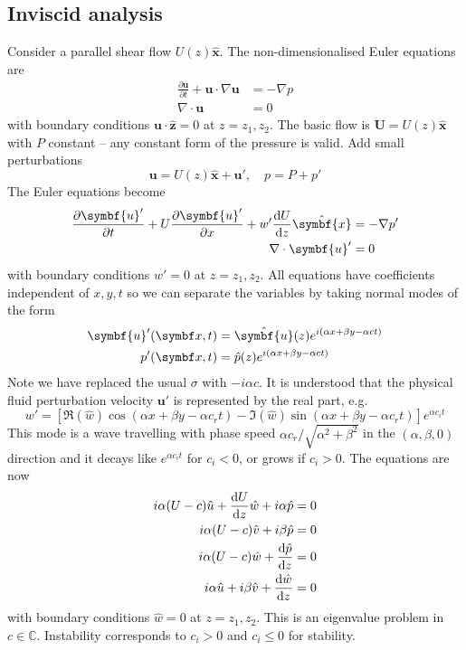 \documentclass{jknotes}
\renewcommand{\u}{\symbf{u}}
\begin{document}
\subsection{Inviscid analysis}
Consider a parallel shear flow $U(z)\hat{\symbf{x}}$. The non-dimensionalised
Euler equations are
\begin{align}
	\frac{\partial \u}{\partial t} + \u \cdot  \nabla \u &= - \nabla p \\
	\nabla \cdot \u &= 0
\end{align}
with boundary conditions $\u \cdot \hat{\symbf{z}} = 0$ at $z=z_1,z_2$. The
basic flow is $\symbf{U} = U(z)\hat{\symbf{x}}$ with $P$ constant -- any
constant form of the pressure is valid.  Add small perturbations
\begin{equation}
	\u = U(z)\hat{\symbf{x}} + \u', \hspace{1em}p = P + p'
\end{equation}
The Euler equations become
\begin{align}
	\frac{\partial \u'}{\partial t} + U\frac{\partial \u'}{\partial x} + w'
	\frac{\diffd U}{\diffd z} \hat{\symbf{x}} &= - \nabla p' \\
	\nabla \cdot \u' &= 0 
\end{align}
with boundary conditions $w' = 0$ at $z=z_1, z_2$. All equations have
coefficients independent of $x, y, t$ so we can separate the variables by
taking normal modes of the form
\begin{align}
	\u'(\x,t) &= \hat{\u}(z) e^{i(\alpha x  + \beta y - \alpha c t)} \\
	p'(\x,t)  &= \hat{p}(z) e^{i(\alpha x+ \beta y - \alpha c t)}
\end{align}
Note we have replaced the usual $\sigma$ with $-i\alpha c$. It is understood
that the physical fluid perturbation velocity $\u'$ is represented by the real
part, e.g.
\begin{equation}
	w' = \left[ \Re(\hat{w})\cos(\alpha x + \beta y - \alpha c_r t)
	-\Im(\hat{w})\sin(\alpha x+\beta y - \alpha c_r t)\right] e^{\alpha c_i t}
\end{equation}
This mode is a wave travelling with phase speed  $\alpha c_r /\sqrt{\alpha^2 +
\beta^2}$ in the $(\alpha, \beta, 0)$ direction and it decays like $e^{\alpha
c_i t}$ for $c_i < 0$, or grows if $c_i > 0$.  The equations are now
\begin{align}
i\alpha (U-c)\hat{u} + \frac{\diffd U}{\diffd z} \hat{w} + i \alpha\hat{p} &=
0 \label{eq:l6:1}\\
i\alpha (U-c)\hat{v} +  i \beta\hat{p} &=
0 \label{eq:l6:2} \\
i\alpha (U-c)\hat{w} +  \frac{\diffd \hat{p}}{\diffd z} &=
0 \label{eq:l6:3}\\
i\alpha \hat{u} + i\beta \hat{v} + \frac{\diffd \hat{w}}{\diffd z} &=
0\label{eq:l6:4}
\end{align}
with boundary conditions  $\hat{w}= 0$ at $z=z_1, z_2$. This is an eigenvalue
problem in $c \in \mathbb{C}$. Instability  corresponds to $c_i > 0$ and $c_i
\le 0$ for stability.
\end{document}
